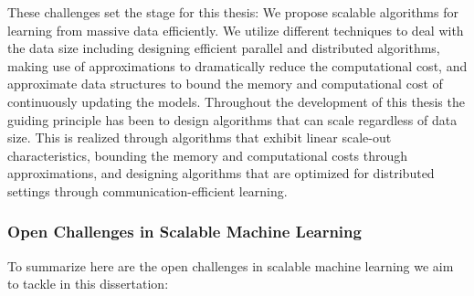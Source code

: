 These challenges set the stage for this thesis: We propose scalable algorithms
for learning from massive data efficiently. We utilize different techniques
to deal with the data size including designing efficient parallel and distributed
algorithms, making use of approximations to dramatically reduce the computational
cost, and approximate data structures to bound the memory and computational cost
of continuously updating the models. Throughout the development of this thesis the guiding
principle has been to design algorithms that can scale regardless of data size.
This is realized through algorithms that exhibit linear scale-out characteristics,
bounding the memory and computational costs through approximations, and designing
algorithms that are optimized for distributed settings through communication-efficient
learning.


\subsubsection*{Open Challenges in Scalable Machine Learning}

To summarize here are the open challenges in scalable machine learning
we aim to tackle in this dissertation:

